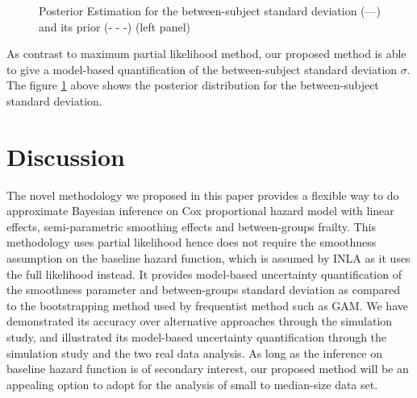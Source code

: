 \documentclass[]{article}
\begin{document}
\begin{figure}[ht]
\centering
{}
\caption{Posterior Estimation for the between-subject standard deviation (---) and its prior (- - -)  (left panel)}
\label{fig:BetweenSubjectSD}
\end{figure}

As contrast to maximum partial likelihood method, our proposed method is able to give a model-based quantification of the between-subject standard deviation $\sigma$. The figure \ref{fig:BetweenSubjectSD} above shows the posterior distribution for the between-subject standard deviation. 



\section{Discussion}\label{sec:discussion}

The novel methodology we proposed in this paper provides a flexible way to do approximate Bayesian inference on Cox proportional hazard model with linear effects, semi-parametric smoothing effects and between-groups frailty. This methodology uses partial likelihood hence does not require the smoothness assumption on the baseline hazard function, which is assumed by INLA as it uses the full likelihood instead. It provides model-based uncertainty quantification of the smoothness parameter and between-groups standard deviation as compared to the bootstrapping method used by frequentist method such as GAM. We have demonstrated its accuracy over alternative approaches through the simulation study, and illustrated its model-based uncertainty quantification through the simulation study and the two real data analysis. As long as the inference on baseline hazard function is of secondary interest, our proposed method will be an appealing option to adopt for the analysis of small to median-size data set.
\end{document}
